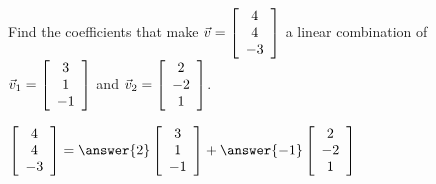\documentclass{ximera}
\author{Zack Reed}
\begin{document}
\begin{exercise}
  Find the coefficients that make $\vec{v}= \startmat{c} 4 \\ 4 \\ -3 \stopmat$ a linear combination of $\vec{v}_1 = \startmat{c} 3 \\ 1 \\ -1 \stopmat$ and $\vec{v}_2 = \startmat{c} 2 \\ -2 \\ 1 \stopmat$.


  $\startmat{c} 4 \\ 4 \\-3 \stopmat = \answer{2} \startmat{c} 3 \\ 1 \\ -1 \stopmat + \answer{-1} \startmat{c} 2 \\ -2 \\ 1 \stopmat$
  
\end{exercise}
\end{document}
